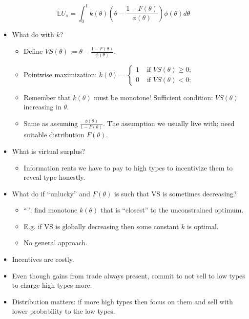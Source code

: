 \documentclass[english]{beamer}		%
\def\lyxframeend{} %
\begin{document}
\begin{equation*}
\mathbb{E} U_s = \int_0^1 k(\theta) \left( \theta - \frac{1-F(\theta)}{\phi(\theta)} \right) \phi(\theta) d\theta
\end{equation*}
\begin{itemize}
	\item What do with $k$?
	\begin{itemize}[<+->]
		\item Define  $VS(\theta) := \theta - \frac{1-F(\theta)}{\phi(\theta)}$.
		\item Pointwise maximization: 
			$k(\theta) = \begin{cases}
				1 & \text{ if } VS(\theta) \geq 0;
				\\ 0 & \text{ if } VS(\theta) < 0;
			\end{cases}$
		\item Remember that $k(\theta)$ must be monotone! Sufficient condition: $VS(\theta)$ increasing in $\theta$.
		\item Same as assuming  $\frac{\phi(\theta)}{1-F(\theta)}$. The assumption we usually live with; need suitable distribution $F(\theta)$.
	\end{itemize}
\end{itemize}
\lyxframeend


\begin{itemize}
	\item What is virtual surplus?
	\begin{itemize}
		\item Information rents we have to pay to high types to incentivize them to reveal type honestly.
	\end{itemize}
	\item What do if ``unlucky'' and $F(\theta)$ is such that VS is sometimes decreasing?
	\begin{itemize}
		\item ``'': find monotone $k(\theta)$ that is ``closest'' to the unconstrained optimum.
		\item E.g. if VS is globally decreasing then some constant $k$ is optimal.
		\item No general approach.
	\end{itemize}
\end{itemize}
\lyxframeend


\begin{itemize}
	\item Incentives are costly.
	\item Even though gains from trade always present, commit to not sell to low types to charge high types more.
	\item Distribution matters: if more high types then focus on them and sell with lower probability to the low types.
\end{itemize}
\lyxframeend
\end{document}
